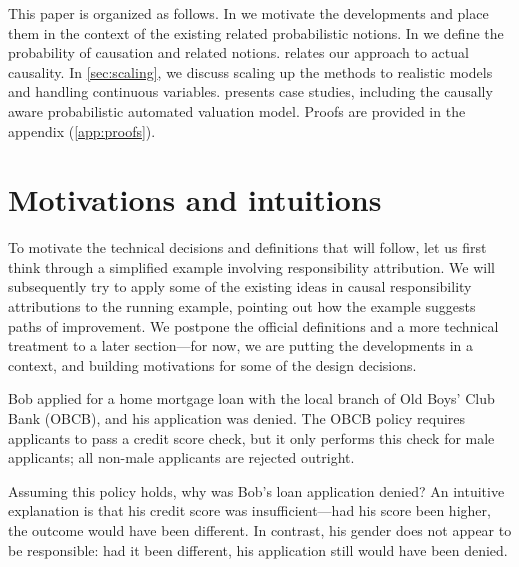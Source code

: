 \documentclass[anon,12pt]{clear2025} %
\renewcommand{\texttt}[1]{\lstinline[basicstyle=\fontsize{8pt}{8.25pt}\selectfont\ttfamily]{#1}}
\begin{document}
This paper is organized as follows. In  we motivate the developments and place them in the context of the existing related probabilistic notions. In  we define the probability of causation and related notions.   relates our approach to actual causality. In \cref{sec:scaling}, we discuss scaling up the methods to realistic models and handling continuous variables.  presents case studies, including the causally aware probabilistic automated valuation model. Proofs are provided in the appendix (\cref{app:proofs}).  




\section{Motivations and intuitions}
\label{sec:intuitions}

To motivate the technical decisions and definitions that will follow, let us first think through a simplified example involving responsibility attribution. We will subsequently try to apply some of the existing ideas in causal responsibility attributions to the running example, pointing out how the example suggests  paths of improvement. We postpone the official definitions and a more technical treatment to a later section---for now, we are putting the developments in a context, and building motivations for some of the design decisions.

\begin{example} Bob applied for a home mortgage loan with the local branch of Old Boys’ Club Bank (OBCB), and his application was denied. The OBCB policy requires applicants to pass a credit score check, but it only performs this check for male applicants; all non-male applicants are rejected outright. \label{ex:obcb}
\end{example}
\noindent Assuming this policy holds, why was Bob’s loan application denied? An intuitive explanation is that his credit score was insufficient—had his score been higher, the outcome would have been different. In contrast, his gender does not appear to be responsible: had it been different, his application still would have been denied.
\end{document}
